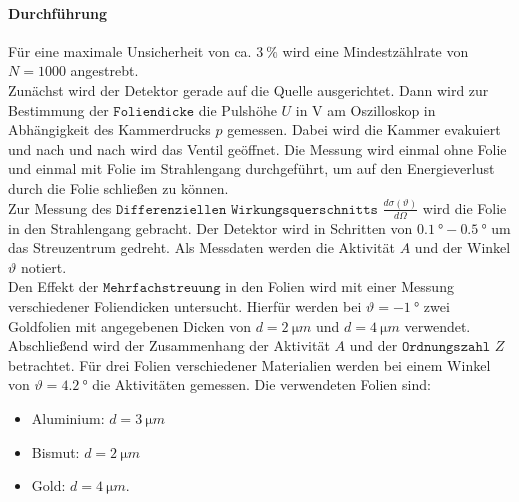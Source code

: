 \paragraph{Durchführung}
Für eine maximale Unsicherheit von ca. $\SI{3}{\%}$ wird eine Mindestzählrate von  $N=1000$ angestrebt.
\\Zunächst wird der Detektor gerade auf die Quelle ausgerichtet.
Dann wird zur Bestimmung der $\texttt{Foliendicke}$ die Pulshöhe $U$ in V am Oszilloskop in Abhängigkeit des Kammerdrucks $p$ gemessen.
Dabei wird die Kammer evakuiert und nach und nach wird das Ventil geöffnet.
Die Messung wird einmal ohne Folie und einmal mit Folie im Strahlengang durchgeführt, um auf den Energieverlust durch die Folie schließen zu können.
\\Zur Messung des $\texttt{Differenziellen Wirkungsquerschnitts}$ $\displaystyle{ \frac{d\sigma (\vartheta)}{d\Omega}}$ wird die Folie in den Strahlengang gebracht.
Der Detektor wird in Schritten von $\SI{0.1}{°} - \SI{0.5}{°}$ um das Streuzentrum gedreht.
Als Messdaten werden die Aktivität $A$ und der Winkel $\vartheta$ notiert.
\\Den Effekt der $\texttt{Mehrfachstreuung}$ in den Folien wird mit einer Messung verschiedener Foliendicken untersucht.
Hierfür werden bei $\vartheta = \SI{-1}{°}$ zwei Goldfolien mit angegebenen Dicken von $d=\SI{2}{\micro m}$ und $d = \SI{4}{\micro m}$ verwendet.
\\Abschließend wird der Zusammenhang der Aktivität $A$ und der $\texttt{Ordnungszahl}$ $Z$ betrachtet.
Für drei Folien verschiedener Materialien werden bei einem Winkel von $\vartheta = \SI{4.2}{°}$ die Aktivitäten gemessen.
Die verwendeten Folien sind:
\begin{itemize}
	\item Aluminium: $d=\SI{3}{\micro m}$
	\item Bismut: $d=\SI{2}{\micro m}$
	\item Gold: $d=\SI{4}{\micro m}$.
\end{itemize}
%
%
